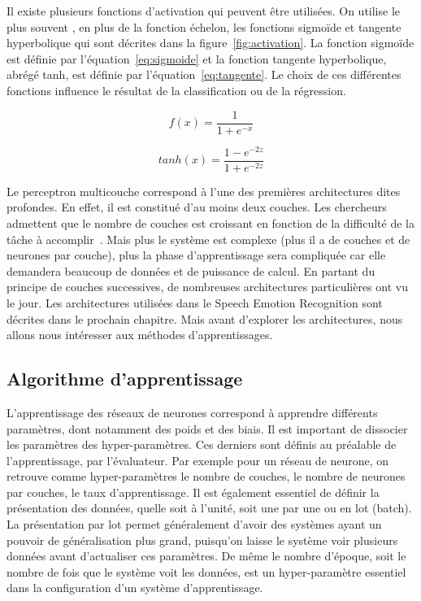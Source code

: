 

Il existe plusieurs fonctions d'activation qui peuvent être utilisées. On utilise le plus souvent , en plus de la fonction échelon, les fonctions sigmoïde et tangente hyperbolique qui sont décrites dans la figure~\ref{fig:activation}. La fonction sigmoïde est définie par l'équation~\ref{eq:sigmoide} et la fonction tangente hyperbolique, abrégé tanh, est définie par l'équation~\ref{eq:tangente}. Le choix de ces différentes fonctions influence le résultat de la classification ou de la régression.

\begin{equation}
  f(x) = \frac{1}{1+ e^{-x}}
  \label{eq:sigmoide}
\end{equation}

\begin{equation}
  tanh(x) = \frac{1-e^{-2z}}{1+e^{-2z}}
  \label{eq:tangente}
\end{equation}

Le perceptron multicouche correspond à l'une des premières architectures dites profondes. En effet, il est constitué d'au moins deux couches. Les chercheurs admettent que le nombre de couches est croissant en fonction de la difficulté de la tâche à accomplir~\cite{Goodfellow2016}. Mais plus le système est complexe (plus il a de couches et de neurones par couche), plus la phase d'apprentissage sera compliquée car elle demandera beaucoup de données et de puissance de calcul.
En partant du principe de couches successives, de nombreuses architectures particulières ont vu le jour. Les architectures utilisées dans le Speech Emotion Recognition sont décrites dans le prochain chapitre. Mais avant d'explorer les architectures, nous allons nous intéresser aux méthodes d'apprentissages.

\subsection{Algorithme d'apprentissage}
L'apprentissage des réseaux de neurones correspond à apprendre différents paramètres, dont notamment des poids et des biais. Il est important de dissocier les paramètres des hyper-paramètres. Ces derniers sont définis au préalable de l'apprentissage, par l'évaluateur. Par exemple pour un réseau de neurone, on retrouve comme hyper-paramètres le nombre de couches, le nombre de neurones par couches, le taux d'apprentissage. Il est également essentiel de définir la présentation des données, quelle soit à l'unité, soit une par une ou en lot (batch). La présentation par lot permet généralement d'avoir des systèmes ayant un pouvoir de généralisation plus grand, puisqu'on laisse le système voir plusieurs données avant d'actualiser ces paramètres. De même le nombre d'époque, soit le nombre de fois que le système voit les données, est un hyper-paramètre essentiel dans la configuration d'un système d'apprentissage.


